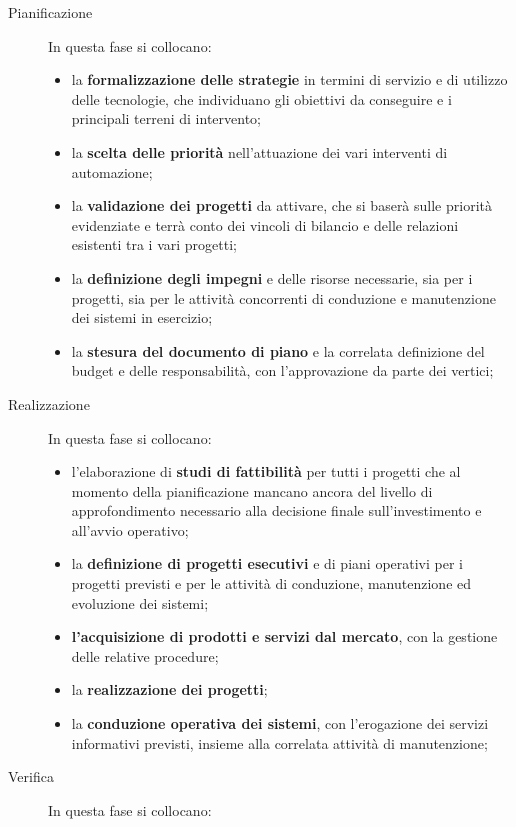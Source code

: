 \begin{description}
    \item[Pianificazione] In questa fase si collocano:
        \begin{itemize}
            \item la \textbf{formalizzazione delle strategie} in termini di servizio e di utilizzo delle tecnologie, che individuano gli obiettivi da conseguire e i principali terreni di intervento;
            \item la \textbf{scelta delle priorità} nell'attuazione dei vari interventi di automazione;
            \item la \textbf{validazione dei progetti} da attivare, che si baserà sulle priorità evidenziate e terrà conto dei vincoli di bilancio e delle relazioni esistenti tra i vari progetti;
            \item la \textbf{definizione degli impegni} e delle risorse necessarie, sia per i progetti, sia per le attività concorrenti di conduzione e manutenzione dei sistemi in esercizio;
            \item la \textbf{stesura del documento di piano} e la correlata definizione del budget e delle responsabilità, con l'approvazione da parte dei vertici;
        \end{itemize}
    \item[Realizzazione] In questa fase si collocano:
        \begin{itemize}
            \item l'elaborazione di \textbf{studi di fattibilità} per tutti i progetti che al momento della pianificazione mancano ancora del livello di approfondimento necessario alla decisione finale sull'investimento e all'avvio operativo;
            \item la \textbf{definizione di progetti esecutivi} e di piani operativi per i progetti previsti e per le attività di conduzione, manutenzione ed evoluzione dei sistemi;
            \item \textbf{l'acquisizione di prodotti e servizi dal mercato}, con la gestione delle relative procedure;
            \item la \textbf{realizzazione dei progetti};
            \item la \textbf{conduzione operativa dei sistemi}, con l'erogazione dei servizi informativi previsti, insieme alla correlata attività di manutenzione;
        \end{itemize}
    \item[Verifica] In questa fase si collocano:

\end{description}
